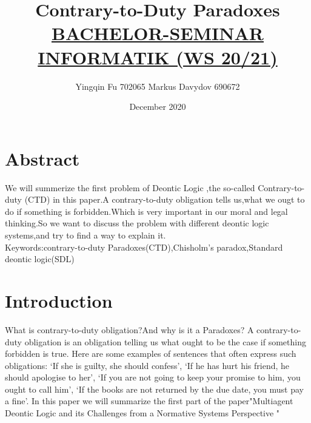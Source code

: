 \documentclass{article}
\title{Contrary-to-Duty Paradoxes\\{\normalsize  \underline{BACHELOR-SEMINAR INFORMATIK  (WS 20/21)}}}
\author{Yingqin Fu 702065 Markus Davydov 690672 }
\date{December 2020}
\begin{document}
\maketitle

\tableofcontents
\section*{Abstract}
We will summerize the first problem of Deontic Logic ,the so-called Contrary-to-duty (CTD) in this paper.A contrary-to-duty obligation tells us,what we ougt to do if something is forbidden.Which is very important in our moral and legal thinking.So we want to discuss the problem with different deontic logic systems,and try to find a way to explain it.\\
Keywords:contrary-to-duty Paradoxes(CTD),Chisholm’s paradox,Standard deontic logic(SDL)
\section*{Introduction}
What is contrary-to-duty obligation?And why is it a Paradoxes? A contrary-to-duty obligation is an obligation telling us what ought to be the case if something forbidden is true. Here are some examples of sentences that often express such obligations: ‘If she is guilty, she should confess’, ‘If he has hurt his friend, he should apologise to her’, ‘If you are not going to keep your promise to him, you ought to call him’, ‘If the books are not returned by the due date, you must pay a fine’. In this paper we will summarize the first part of the paper"Multiagent Deontic Logic and its Challenges from a Normative Systems Perspective "\cite{1} 
\end{document}
